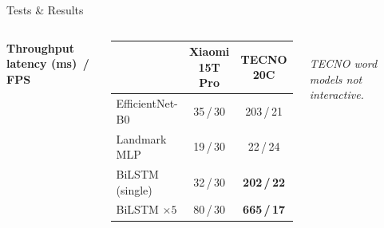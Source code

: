\documentclass[aspectratio=169,11pt]{beamer}
\begin{document}
\begin{frame}{Tests \& Results}
\begin{columns}[T,onlytextwidth]
      \scriptsize\bfseries\color{Teal}Throughput \,\textperiodcentered\, latency (ms) \,/\, FPS\\[2pt]
      \footnotesize
      \renewcommand{\arraystretch}{1.00}
      \begin{tabular}{@{}l c c@{}}
        \toprule
                            & \textbf{Xiaomi 15T Pro} & \textbf{TECNO 20C} \\
        \midrule
        EfficientNet-B0     & 35\,/\,30   & 203\,/\,21  \\
        Landmark MLP        & 19\,/\,30   & 22\,/\,24   \\
        BiLSTM (single)     & 32\,/\,30   & \textcolor{Warn}{\textbf{202\,/\,22}} \\
        BiLSTM $\times 5$   & 80\,/\,30   & \textcolor{Warn}{\textbf{665\,/\,17}} \\
        \bottomrule
      \end{tabular}\\[1pt]
      {\scriptsize\itshape\color{TxtSec}
        TECNO word models \textcolor{Warn}{not interactive}.}

      \vspace{0.02cm}
      \begin{center}
      \end{center}
  \end{columns}
\end{frame}
\end{document}
